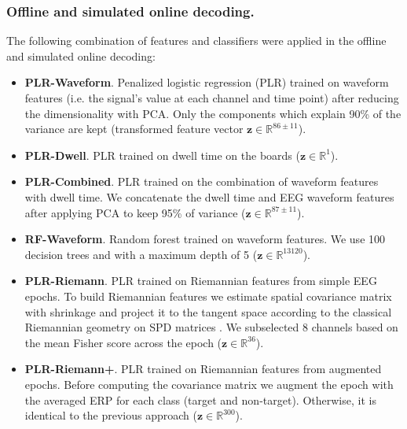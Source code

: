 \documentclass[12pt]{iopart}
\begin{document}
\subsubsection*{Offline and simulated online decoding.}
The following combination of features and classifiers were applied in the offline and simulated online decoding:
\begin{itemize}
    \item \textbf{PLR-Waveform}. Penalized logistic regression (PLR) trained on waveform features (i.e. the signal's
        value at each channel and time point) after reducing
        the dimensionality with PCA. Only the components which explain 90\% of the variance
        are kept (transformed feature vector $\mathbf{z} \in \mathbb{R}^{86 \pm 11}$).
    \item \textbf{PLR-Dwell}. PLR trained on dwell time on the boards ($\mathbf{z} \in \mathbb{R}^{1}$).
    \item \textbf{PLR-Combined}. PLR trained on the combination of waveform features with dwell time. We concatenate
        the dwell time and EEG waveform features after applying PCA to keep 95\% of variance ($\mathbf{z} \in \mathbb{R}^{87 \pm 11}$). 

    \item \textbf{RF-Waveform}. Random forest trained on waveform features. We use 100 decision trees and
        with a maximum depth of 5 ($\mathbf{z} \in \mathbb{R}^{13120}$).
    \item \textbf{PLR-Riemann}. PLR trained on Riemannian features from simple EEG epochs.
        To build Riemannian features we
        estimate spatial covariance matrix with shrinkage and project it
        to the tangent space according to the classical Riemannian geometry on SPD matrices
        \cite{barachant_multiclass_2012}.
        We subselected 8 channels based on the mean Fisher score across the epoch
        ($\mathbf{z} \in \mathbb{R}^{36}$).
    \item \textbf{PLR-Riemann+}. PLR trained on Riemannian features from augmented epochs.
        Before computing the covariance matrix we augment the epoch with the averaged ERP
        for each class (target and non-target). Otherwise, it is identical to the previous
        approach ($\mathbf{z} \in \mathbb{R}^{300}$).
\end{itemize}
\end{document}
